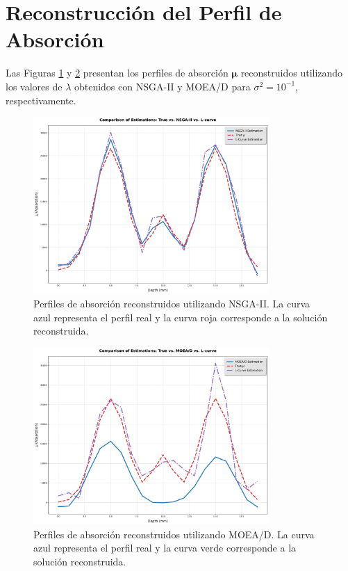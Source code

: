 \section{Reconstrucción del Perfil de Absorción} \label{sec:results:reconstruction}

Las Figuras \ref{fig:reconstruction_profiles_nsga2} y \ref{fig:reconstruction_profiles_moead} presentan los perfiles de absorción \( \mathbf{\mu} \) reconstruidos utilizando los valores de \( \lambda \) obtenidos con NSGA-II y MOEA/D para \( \sigma^2 = 10^{-1} \), respectivamente.

\begin{figure}[H]
    \centering
    \includegraphics[width=0.8\textwidth]{Images/reconstruction_profiles_nsga2.png}
    \caption{Perfiles de absorción reconstruidos utilizando NSGA-II. La curva azul representa el perfil real y la curva roja corresponde a la solución reconstruida.}
    \label{fig:reconstruction_profiles_nsga2}
\end{figure}

\begin{figure}[H]
    \centering
    \includegraphics[width=0.8\textwidth]{Images/reconstruction_profiles_moead.png}
    \caption{Perfiles de absorción reconstruidos utilizando MOEA/D. La curva azul representa el perfil real y la curva verde corresponde a la solución reconstruida.}
    \label{fig:reconstruction_profiles_moead}
\end{figure}

